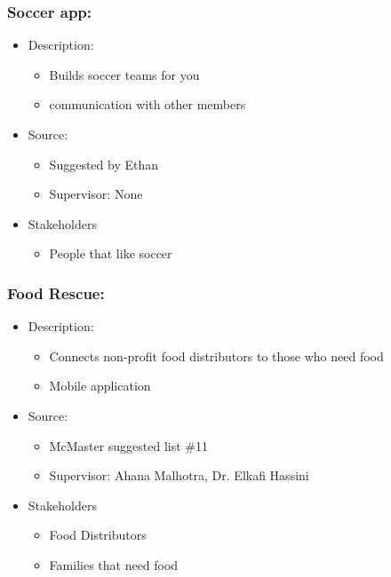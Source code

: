 \documentclass{article}
\begin{document}
\subsubsection*{Soccer app:}
\label{subsec:soccer}
\begin{itemize}
    \item Description:
    \begin{itemize}
        \item Builds soccer teams for you
        \item communication with other members
    \end{itemize}
    \item Source:
    \begin{itemize}
        \item Suggested by Ethan
        \item Supervisor: None
    \end{itemize}
    \item Stakeholders
    \begin{itemize}
        \item People that like soccer
    \end{itemize}
\end{itemize}

\subsubsection*{Food Rescue:}
\label{subsec:foodrescue}
\begin{itemize}
    \item Description:
    \begin{itemize}
        \item Connects non-profit food distributors to those who need food 
        \item Mobile application
    \end{itemize}
    \item Source:
    \begin{itemize}
        \item McMaster suggested list \#11
        \item Supervisor: Ahana Malhotra, Dr. Elkafi Hassini
    \end{itemize}
    \item Stakeholders
    \begin{itemize}
        \item Food Distributors
        \item Families that need food
    \end{itemize}
\end{itemize}
\end{document}
